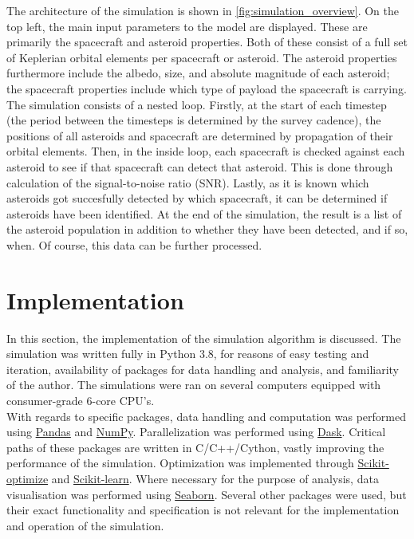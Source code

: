 The architecture of the simulation is shown in \autoref{fig:simulation_overview}. On the top left, the main input parameters to the model are displayed. These are primarily the spacecraft and asteroid properties. Both of these consist of a full set of Keplerian orbital elements per spacecraft or asteroid. The asteroid properties furthermore include the albedo, size, and absolute magnitude of each asteroid; the spacecraft properties include which type of payload the spacecraft is carrying. \\

The simulation consists of a nested loop. Firstly, at the start of each timestep (the period between the timesteps is determined by the survey cadence), the positions of all asteroids and spacecraft are determined by propagation of their orbital elements. Then, in the inside loop, each spacecraft is checked against each asteroid to see if that spacecraft can detect that asteroid. This is done through calculation of the signal-to-noise ratio (SNR). Lastly, as it is known which asteroids got succesfully detected by which spacecraft, it can be determined if asteroids have been identified. At the end of the simulation, the result is a list of the asteroid population in addition to whether they have been detected, and if so, when. Of course, this data can be further processed.

\section{Implementation}
\label{sec:methodologyimplementation}
In this section, the implementation of the simulation algorithm is discussed. The simulation was written fully in Python 3.8, for reasons of easy testing and iteration, availability of packages for data handling and analysis, and familiarity of the author. The simulations were ran on several computers equipped with consumer-grade 6-core CPU's. \\

With regards to specific packages, data handling and computation was performed using \href{https://pandas.pydata.org}{Pandas} and \href{https://numpy.org}{NumPy}. Parallelization was performed using \href{https://dask.org}{Dask}. Critical paths of these packages are written in C/C++/Cython, vastly improving the performance of the simulation. Optimization was implemented through \href{https://pypi.org/project/scikit-optimize}{Scikit-optimize} and \href{https://scikit-learn.org/stable/index.html}{Scikit-learn}. Where necessary for the purpose of analysis, data visualisation was performed using \href{https://seaborn.pydata.org}{Seaborn}. Several other packages were used, but their exact functionality and specification is not relevant for the implementation and operation of the simulation.

